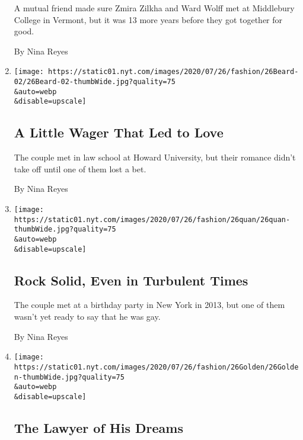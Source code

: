 \begin{enumerate}
  A mutual friend made sure Zmira Zilkha and Ward Wolff met at
  Middlebury College in Vermont, but it was 13 more years before they
  got together for good.

  By Nina Reyes
\item
  \href{/2020/07/24/fashion/weddings/a-little-wager-that-led-to-love.html}{}

  \texttt{[image: https://static01.nyt.com/images/2020/07/26/fashion/26Beard-02/26Beard-02-thumbWide.jpg?quality=75\\\&auto=webp\\\&disable=upscale]}

  \hypertarget{a-little-wager-that-led-to-love}{%
  \subsection{A Little Wager That Led to
  Love}\label{a-little-wager-that-led-to-love}}

  The couple met in law school at Howard University, but their romance
  didn't take off until one of them lost a bet.

  By Nina Reyes
\item
  \href{/2020/07/24/fashion/weddings/rock-solid-even-in-turbulent-times.html}{}

  \texttt{[image: https://static01.nyt.com/images/2020/07/26/fashion/26quan/26quan-thumbWide.jpg?quality=75\\\&auto=webp\\\&disable=upscale]}

  \hypertarget{rock-solid-even-in-turbulent-times}{%
  \subsection{Rock Solid, Even in Turbulent
  Times}\label{rock-solid-even-in-turbulent-times}}

  The couple met at a birthday party in New York in 2013, but one of
  them wasn't yet ready to say that he was gay.

  By Nina Reyes
\item
  \href{/2020/07/24/fashion/weddings/the-lawyer-of-his-dreams.html}{}

  \texttt{[image: https://static01.nyt.com/images/2020/07/26/fashion/26Golden/26Golden-thumbWide.jpg?quality=75\\\&auto=webp\\\&disable=upscale]}

  \hypertarget{the-lawyer-of-his-dreams}{%
  \subsection{The Lawyer of His Dreams}\label{the-lawyer-of-his-dreams}}


\end{enumerate}
